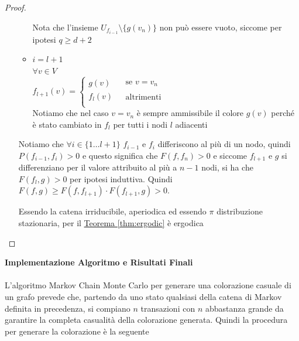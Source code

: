 \documentclass{article}
\begin{document}
\begin{proof}
\begin{itemize}
\begin{itemize}
            Nota che l'insieme $U_{f_{i-1}} \setminus \{g(v_n) \} $ non può essere vuoto, siccome per ipotesi $q \geq d + 2$ \vspace{14pt}


            \item $i = l+1$ \\
            $\forall v \in V$ \\
              $f_{l+1}(v) = \left\{\begin{array}{ll}
                g(v) & \begin{array}{c} \text { se } v = v_n \end{array}\\
                f_{l}(v) & \begin{array}{c} \text { altrimenti } \end{array}\\
        \end{array}\right. $ \\
        Notiamo che nel caso $v =v_n$ è sempre ammissibile il colore $g(v)$ perché è stato cambiato in $f_{l}$ per tutti i nodi $l$ adiacenti 
        \end{itemize}\vspace{14pt}

        Notiamo che $\forall i \in \{1 \dots l+1\}$ $f_{i-1}$ e $f_{i}$ differiscono al più di un nodo, quindi $P(f_{i-1},f_{i}) > 0 $ e questo significa che $F(f, f_n) > 0$ e siccome $f_{l+1}$ e $g$ si differenziano per il valore attribuito al più a $n-1$ nodi, si ha che $F(f_l,g) > 0$ per ipotesi induttiva. Quindi $F(f,g) \geq F(f, f_{l+1}) \cdot F(f_{l+1}, g) > 0$.

        Essendo la catena irriducibile, aperiodica ed essendo $\pi$ distribuzione stazionaria, per il \hyperref[thm:ergodic]{Teorema \ref*{thm:ergodic}} è ergodica
      

\end{itemize}
\end{proof}

\vspace{14pt}

\textbf{Implementazione Algoritmo e Risultati Finali} \\ \\
L'algoritmo Markov Chain Monte Carlo per generare una colorazione casuale di un grafo prevede che, partendo da uno stato qualsiasi della catena di Markov definita in precedenza, si compiano $n$ transazioni con $n$ abbastanza grande da garantire la completa casualità della colorazione generata. Quindi la procedura per generare la colorazione è la seguente
\end{document}

